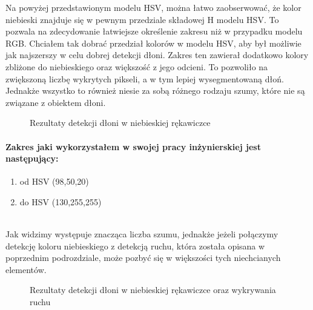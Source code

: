 \documentclass[a4paper,12pt,twoside,openany]{report}
\newcommand{\ImgPath}{.}
\begin{document}
Na powyżej przedstawionym modelu HSV, można łatwo zaobserwować, że kolor niebieski znajduje się w pewnym przedziale składowej H modelu HSV. To pozwala na zdecydowanie łatwiejsze określenie zakresu niż w przypadku modelu RGB. 
Chciałem tak dobrać przedział kolorów w modelu HSV, aby był możliwie jak najszerszy w celu dobrej detekcji dłoni. Zakres ten zawierał dodatkowo kolory zbliżone do niebieskiego oraz większość z jego odcieni. To pozwoliło na zwiększoną liczbę wykrytych pikseli, a w tym lepiej wysegmentowaną dłoń. Jednakże wszystko to również niesie za sobą różnego rodzaju szumy, które nie są związane z obiektem dłoni. 
\begin{figure}[H]
	\centering
	\caption{Rezultaty detekcji dłoni w niebieskiej rękawiczce}
\end{figure}

\paragraph{Zakres jaki wykorzystałem w swojej pracy inżynierskiej jest następujący:}
\begin{enumerate}
	\item od HSV (98,50,20)
	\item do HSV (130,255,255)
\end{enumerate}
\mbox{} \\

Jak widzimy występuje znacząca liczba szumu, jednakże jeżeli połączymy detekcję koloru niebieskiego z detekcją ruchu, która została opisana w poprzednim podrozdziale, może pozbyć się w większości tych niechcianych elementów. 

\begin{figure}[H]
	\centering
	\caption{Rezultaty detekcji dłoni w niebieskiej rękawiczce oraz wykrywania ruchu}
\end{figure}
\end{document}
